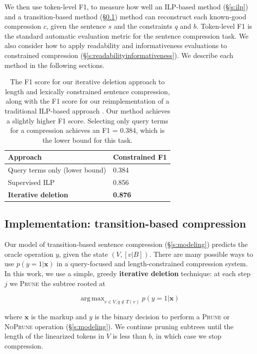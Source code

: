 \documentclass[11pt,a4paper]{article}
\DeclareMathOperator*{\argmaxA}{arg\,max} %
\begin{document}
We then use token-level F1, to measure how well an ILP-based method (\S\ref{s:ilp}) and a transition-based method (\S\ref{s:transition}) method can reconstruct each known-good compression $c$, given the sentence $s$ and the constraints $q$ and $b$. Token-level F1 is the standard automatic evaluation metric for the sentence compression task. We also consider how to apply readability and informativeness evaluations to constrained compression (\S\ref{s:readabilityinformativeness}). We describe each method in the following sections.
    
\begin{table}[htb!]
\begin{tabular}{ll}
\centering
Approach & Constrained F1  \\ \hline
Query terms only {\small (lower bound)} & 0.384    \\
Supervised ILP  & 0.856          \\
 \textbf{Iterative deletion} &  \textbf{0.876}    \\
\end{tabular}
\caption{The F1 score for our iterative deletion approach to length and lexically constrained sentence compression, along with the F1 score for our reimplementation of a traditional ILP-based approach \cite{filippova2013overcoming}. Our method achieves a slightly higher F1 score. Selecting only query terms for a compression achieves an F1 = 0.384, which is the lower bound for this task.}
\end{table}

\subsection{Implementation: transition-based compression}\label{s:transition}

Our model of transition-based sentence compression (\S\ref{s:modeling}) predicts the oracle operation $y$, given the state $(V,[v|B])$. There are many possible ways to use $p(y=1| \bm{x})$ in a query-focused and length-constrained compression system. In this work, we use a simple, greedy \textbf{iterative deletion} technique: at each step $j$ we \textsc{Prune} the subtree rooted at 

$$\argmaxA_{v \in V,q\not\in T(v)}   p(y = 1 | \bm{x})$$

\noindent where $\bm{x}$ is the markup and $y$ is the binary decision to perform a \textsc{Prune} or \textsc{NoPrune} operation (\S\ref{s:modeling}). We continue pruning subtrees until the length of the linearized tokens in $V$ is less than $b$, in which case we stop compression. 
\end{document}
